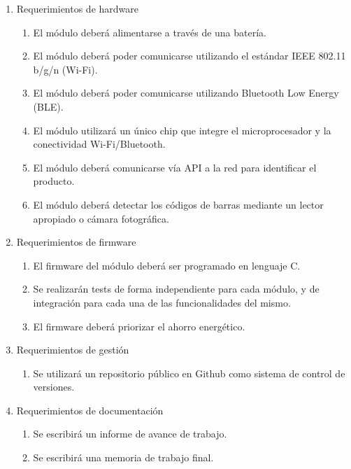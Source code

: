 \documentclass[
11pt, %
codirector, %
]{charter}
\begin{document}
\begin{enumerate}
\begin{enumerate}
		\end{enumerate}
	\item Requerimientos de hardware
		\begin{enumerate}
			 \item El módulo deberá alimentarse a través de una batería.
			\item El módulo deberá poder comunicarse utilizando el estándar IEEE 802.11 b/g/n
(Wi-Fi).
            \item El módulo deberá poder comunicarse utilizando Bluetooth Low Energy (BLE).
            \item El módulo utilizará un único chip que integre el microprocesador y la conectividad Wi-Fi/Bluetooth.
            \item El módulo deberá comunicarse vía API a la red para identificar el producto.
            \item El módulo deberá detectar los códigos de barras mediante un lector apropiado o cámara fotográfica.
		\end{enumerate}
	\item Requerimientos de firmware
         \begin{enumerate}
            \item El firmware del módulo deberá ser programado en lenguaje C.
            \item Se realizarán tests de forma independiente para cada módulo, y de integración para cada una de las funcionalidades del mismo.
            \item El firmware deberá priorizar el ahorro energético. 
         \end{enumerate}
	\item Requerimientos de gestión
        \begin{enumerate}
            \item Se utilizará un repositorio público en Github como sistema de control de versiones.
         \end{enumerate}
    \item Requerimientos de documentación
        \begin{enumerate}
            \item Se escribirá un informe de avance de trabajo.
            \item Se escribirá una memoria de trabajo final.

            
         \end{enumerate}

    
	
\end{enumerate}
\end{document}
